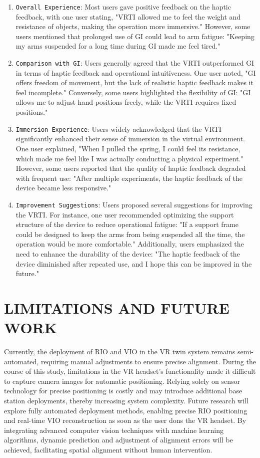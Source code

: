 \documentclass[runningheads]{llncs}
\begin{document}
\begin{enumerate}
  \item {\texttt{Overall Experience}}: Most users gave positive feedback on the haptic feedback, with one user stating, "VRTI allowed me to feel the weight and resistance of objects, making the operation more immersive." However, some users mentioned that prolonged use of GI could lead to arm fatigue: "Keeping my arms suspended for a long time during GI made me feel tired."

  \item {\texttt{Comparison with GI}}: Users generally agreed that the VRTI outperformed GI in terms of haptic feedback and operational intuitiveness. One user noted, "GI offers freedom of movement, but the lack of realistic haptic feedback makes it feel incomplete." Conversely, some users highlighted the flexibility of GI: "GI allows me to adjust hand positions freely, while the VRTI requires fixed positions."

  \item {\texttt{Immersion Experience}}: Users widely acknowledged that the VRTI significantly enhanced their sense of immersion in the virtual environment. One user explained, "When I pulled the spring, I could feel its resistance, which made me feel like I was actually conducting a physical experiment." However, some users reported that the quality of haptic feedback degraded with frequent use: "After multiple experiments, the haptic feedback of the device became less responsive."

  \item {\texttt{Improvement Suggestions}}: Users proposed several suggestions for improving the VRTI. For instance, one user recommended optimizing the support structure of the device to reduce operational fatigue: "If a support frame could be designed to keep the arms from being suspended all the time, the operation would be more comfortable." Additionally, users emphasized the need to enhance the durability of the device: "The haptic feedback of the device diminished after repeated use, and I hope this can be improved in the future."
\end{enumerate}


\section{LIMITATIONS AND FUTURE WORK}
Currently, the deployment of RIO and VIO in the VR twin system remains semi-automated, requiring manual adjustments to ensure precise alignment. During the course of this study, limitations in the VR headset's functionality made it difficult to capture camera images for automatic positioning. Relying solely on sensor technology for precise positioning is costly and may introduce additional base station deployments, thereby increasing system complexity. Future research will explore fully automated deployment methods, enabling precise RIO positioning and real-time VIO reconstruction as soon as the user dons the VR headset. By integrating advanced computer vision techniques with machine learning algorithms, dynamic prediction and adjustment of alignment errors will be achieved, facilitating spatial alignment without human intervention.
\end{document}
